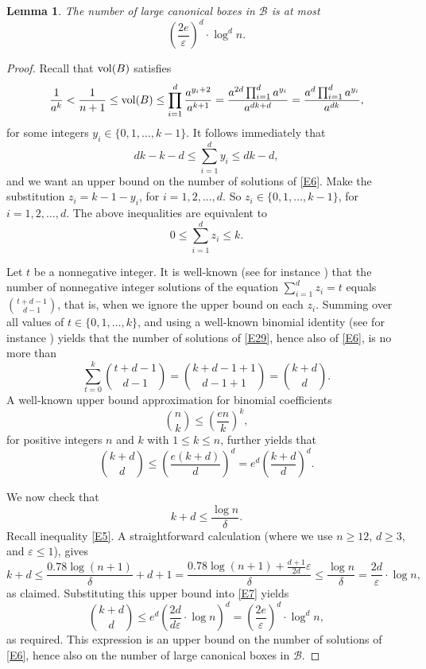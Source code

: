 \documentclass[11pt]{article}
\newtheorem{lemma}{Lemma}
\newcommand{\eps}{\varepsilon}
\def\B{\mathcal B}
\newcommand{\vol}{{\rm vol}}
\begin{document}
\begin{lemma} \label{L8}
The number of large canonical boxes in $\B$ is at most
$$ \left(\frac{2e}{\eps}\right)^d \cdot \log^d{n}. $$
\end{lemma}
\begin{proof}
Recall that $\vol(B)$ satisfies
$$ \frac{1}{a^k} < \frac{1}{n+1} \leq \vol(B) \leq
\prod_{i=1}^d \frac{a^{y_i+2}}{a^{k+1}} =
\frac{a^{2d} \prod_{i=1}^d a^{y_i}}{a^{dk+d}}=
\frac{a^{d} \prod_{i=1}^d a^{y_i}}{a^{dk}}, $$
for some integers $y_i \in \{0,1,\ldots,k-1\}$. 
It follows immediately that
\begin{equation} \label{E6}
dk-k-d \leq \sum_{i=1}^d y_i \leq dk-d, 
\end{equation} 
and we want an upper bound on the number of solutions of  \eqref{E6}.
Make the substitution $z_i=k-1-y_i$, for $i=1,2,\ldots,d$. 
So $z_i \in \{0,1,\ldots,k-1\}$, for $i=1,2,\ldots,d$. 
The above inequalities are equivalent to
\begin{equation} \label{E29}
0 \leq \sum_{i=1}^d z_i \leq k. 
\end{equation} 


Let $t$ be a nonnegative integer. It is well-known (see for instance 
\cite{T95}) that the number of
nonnegative integer solutions of the equation $ \sum_{i=1}^d z_i =t$ 
equals ${t+d-1 \choose d-1}$, that is, when we ignore the upper bound
on each $z_i$. Summing over all values of $t \in \{0,1,\ldots,k\}$,
and using a well-known binomial identity (see for instance 
\cite[p. 217]{T95}) 
yields that the number of solutions of \eqref{E29}, hence also of \eqref{E6},
is no more than
$$ \sum_{t=0}^{k} {t+d-1 \choose d-1} = {k+d-1+1 \choose d-1+1} =
{k+d \choose d} . $$
A well-known upper bound approximation for binomial coefficients
$$ {n \choose k} \leq \left(\frac{en}{k}\right)^k, $$
for positive integers $n$ and $k$ with $1 \leq k \leq n$, further yields that
\begin{equation} \label{E7}
{k+d \choose d} \leq \left(\frac{e(k+d)}{d}\right)^d =
e^d \left(\frac{k+d}{d}\right)^d. 
\end{equation} 


We now check that 
$$ k+d \leq \frac{\log{n}}{\delta}. $$
Recall inequality \eqref{E5}. A straightforward calculation 
(where we use $n \geq 12$, $d \ge 3$, and $\eps \leq 1$), gives
\begin{equation} \label{E15}
k+d \leq \frac{0.78 \log(n+1)}{\delta} + d+1 =
\frac{0.78 \log(n+1)+\frac{d+1}{2d}\eps}{\delta} \leq
\frac{\log{n}}{\delta}= \frac{2d}{\eps} \cdot \log{n},
\end{equation} 
as claimed. Substituting this upper bound into \eqref{E7} yields
\begin{equation} \label{E9}
{k+d \choose d} \leq 
e^d \left(\frac{2d}{d \eps}\cdot \log{n}\right)^d=
\left(\frac{2e}{\eps}\right)^d \cdot \log^d{n}, 
\end{equation} 
as required. This expression is an upper bound on the number of 
solutions of \eqref{E6}, hence also on the number of large canonical
boxes in $\B$.  
\end{proof}
\end{document}
